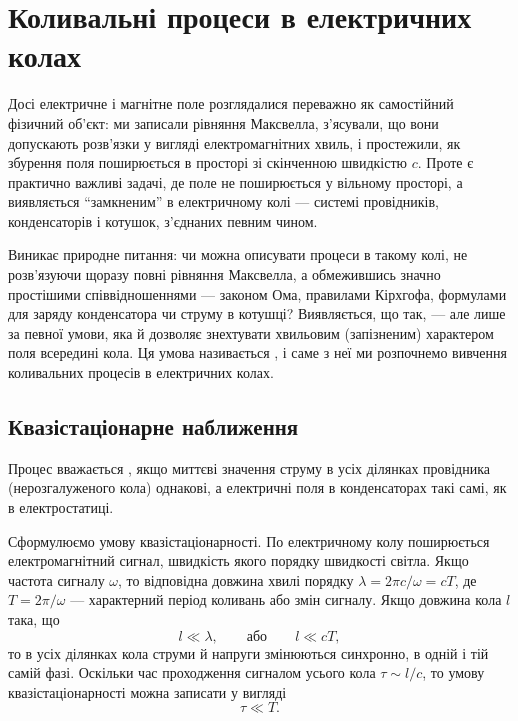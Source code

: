 
\chapter{Коливальні процеси в електричних колах}\label{\currfilebase}\hypertarget{EMOscillations}{}
\graphicspath{{\currfilebase/Pictures}}


Досі електричне і магнітне поле розглядалися переважно як самостійний фізичний об'єкт: ми записали рівняння Максвелла, з'ясували, що вони допускають
розв'язки у вигляді електромагнітних хвиль, і простежили, як збурення поля поширюється в просторі зі скінченною швидкістю $c$. Проте є практично важливі задачі, де поле не поширюється у вільному просторі, а виявляється \enquote{замкненим} в електричному колі --- системі провідників,
конденсаторів і котушок, з'єднаних певним чином.

Виникає природне питання: чи можна описувати процеси в такому колі, не розв'язуючи щоразу повні рівняння Максвелла, а обмежившись значно простішими
співвідношеннями --- законом Ома, правилами Кірхгофа, формулами для заряду конденсатора чи струму в котушці? Виявляється, що так, --- але лише за певної
умови, яка й дозволяє знехтувати хвильовим (запізненим) характером поля всередині кола. Ця умова називається , і саме
з неї ми розпочнемо вивчення коливальних процесів в електричних колах.

\section{Квазістаціонарне наближення}\label{sec:quasi-stationary-approximation}\hypertarget{quasi-stationary-approximation}{}

Процес вважається , якщо миттєві значення струму в усіх ділянках провідника (нерозгалуженого кола) однакові, а електричні поля в конденсаторах такі самі, як в електростатиці.

Сформулюємо умову квазістаціонарності. По електричному колу поширюється електромагнітний сигнал, швидкість якого порядку швидкості світла. Якщо частота сигналу $\omega$, то відповідна довжина хвилі порядку $\lambda = 2\pi c/\omega = cT$, де $T = 2\pi/\omega$ --- характерний період коливань або змін сигналу. Якщо довжина кола $l$ така, що
\begin{equation}\label{eq:quasistationary_condition}
	l \ll \lambda, \qquad \text{або} \qquad l \ll cT,
\end{equation}
то в усіх ділянках кола струми й напруги змінюються синхронно, в одній і тій самій фазі. Оскільки час проходження сигналом усього кола $\tau \sim l/c$, то умову квазістаціонарності можна записати у вигляді
\begin{equation}\label{eq:quasistationary_time}
	\tau \ll T.
\end{equation}

